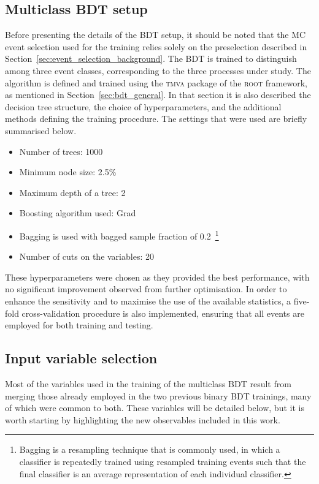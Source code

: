 \subsection{Multiclass BDT setup}
\label{setup_bdt}
Before presenting the details of the BDT setup, it should be noted that the MC event selection used for the training relies solely on the preselection described in Section~\ref{sec:event_selection_background}. The BDT is trained to distinguish among three event classes, corresponding to the three processes under study. The algorithm is defined and trained using the \textsc{tmva} package of the \textsc{root} framework, as mentioned in Section~\ref{sec:bdt_general}. In that section it is also described the decision tree structure, the choice of hyperparameters, and the additional methods defining the training procedure. The settings that were used are briefly summarised below.
\begin{itemize}
    \small
    \item Number of trees: 1000
    \item Minimum node size: 2.5\%
    \item Maximum depth of a tree: 2
    \item Boosting algorithm used: Grad
    \item Bagging is used with bagged sample fraction of 0.2~\footnote{Bagging is a resampling technique that is commonly used, in which a classifier is repeatedly trained using resampled training
    events such that the final classifier is an average representation of each individual classifier.}
    \item Number of cuts on the variables: 20
\end{itemize}
These hyperparameters were chosen as they provided the best performance, with no significant improvement observed from further optimisation. In order to enhance the sensitivity and to maximise the use of the available statistics, a five-fold cross-validation procedure is also implemented, ensuring that all events are employed for both training and testing.

\subsection{Input variable selection}

Most of the variables used in the training of the multiclass BDT result from merging those already employed in the two previous binary BDT trainings, many of which were common to both. These variables will be detailed below, but it is worth starting by highlighting the new observables included in this work.

